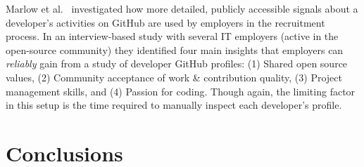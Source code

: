 \documentclass[conference]{IEEEtran}
\begin{document}
Marlow et al.~\cite{Marlow:2013:ATS:2441776.2441794} investigated how more
detailed, publicly accessible signals about a developer's activities on GitHub
are used by employers in the recruitment process. In an interview-based study
with several IT employers (active in the open-source community) they identified
four main insights that employers can \emph{reliably} gain from a study of
developer GitHub profiles: (1) Shared open source values, (2) Community
acceptance of work \& contribution quality, (3) Project management skills, and
(4) Passion for coding. Though again, the limiting factor in this setup is the
time required to manually inspect each developer's profile.


\section{Conclusions}



\end{document}
